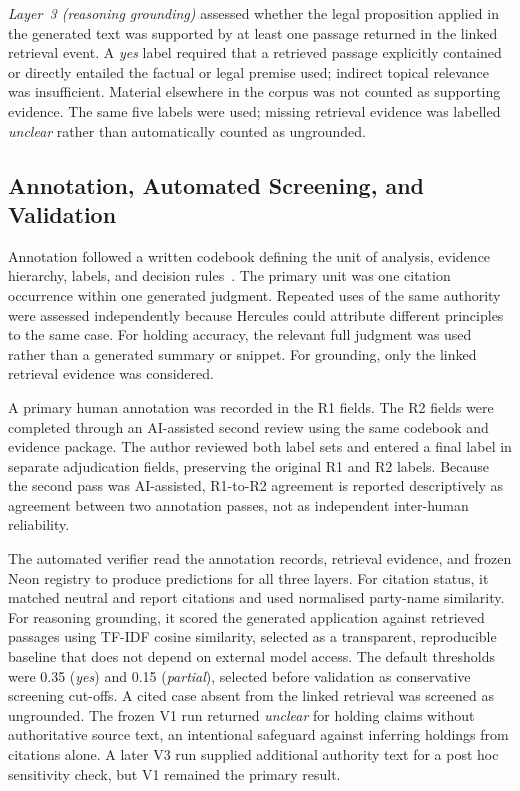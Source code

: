 \documentclass[conference]{IEEEtran}
\begin{document}
\textit{Layer~3 (reasoning grounding)} assessed whether the legal proposition applied in the generated text was supported by at least one passage returned in the linked retrieval event. A \textit{yes} label required that a retrieved passage explicitly contained or directly entailed the factual or legal premise used; indirect topical relevance was insufficient. Material elsewhere in the corpus was not counted as supporting evidence. The same five labels were used; missing retrieval evidence was labelled \textit{unclear} rather than automatically counted as ungrounded.

\subsection{Annotation, Automated Screening, and Validation}

Annotation followed a written codebook defining the unit of analysis, evidence hierarchy, labels, and decision rules~\cite{codebook}. The primary unit was one citation occurrence within one generated judgment. Repeated uses of the same authority were assessed independently because Hercules could attribute different principles to the same case. For holding accuracy, the relevant full judgment was used rather than a generated summary or snippet. For grounding, only the linked retrieval evidence was considered.

A primary human annotation was recorded in the R1 fields. The R2 fields were completed through an AI-assisted second review using the same codebook and evidence package. The author reviewed both label sets and entered a final label in separate adjudication fields, preserving the original R1 and R2 labels. Because the second pass was AI-assisted, R1-to-R2 agreement is reported descriptively as agreement between two annotation passes, not as independent inter-human reliability.

The automated verifier read the annotation records, retrieval evidence, and frozen Neon registry to produce predictions for all three layers. For citation status, it matched neutral and report citations and used normalised party-name similarity. For reasoning grounding, it scored the generated application against retrieved passages using TF-IDF cosine similarity, selected as a transparent, reproducible baseline that does not depend on external model access. The default thresholds were 0.35 (\textit{yes}) and 0.15 (\textit{partial}), selected before validation as conservative screening cut-offs. A cited case absent from the linked retrieval was screened as ungrounded. The frozen V1 run returned \textit{unclear} for holding claims without authoritative source text, an intentional safeguard against inferring holdings from citations alone. A later V3 run supplied additional authority text for a post hoc sensitivity check, but V1 remained the primary result.
\end{document}
